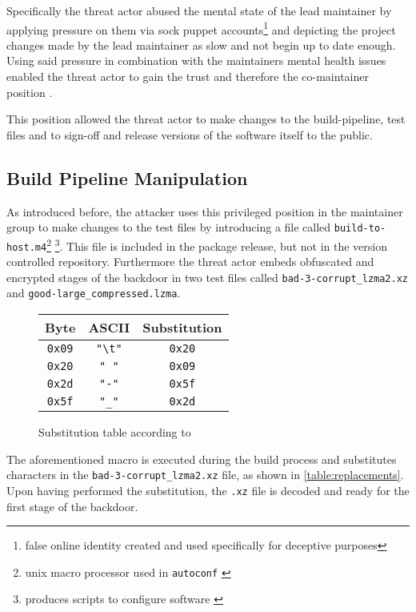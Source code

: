 Specifically the threat actor abused the mental state of the lead maintainer by
applying pressure on them via sock puppet accounts\footnote{false online
identity created and used specifically for deceptive purposes} and depicting
the project changes made by the lead maintainer as slow and not begin up to
date enough. Using said pressure in combination with the maintainers mental
health issues enabled the threat actor to gain the trust and therefore the
co-maintainer position \cite{arstechnica2024xzutils}. 

This position allowed the threat actor to make changes to the build-pipeline,
test files and to sign-off and release versions of the software itself to the
public.

\subsection{Build Pipeline Manipulation}

As introduced before, the attacker uses this privileged position in the
maintainer group to make changes to the test files by introducing a file
called \texttt{build-to-host.m4}\footnote{unix macro processor used in
\texttt{autoconf} \cite{gnu2021m4}} \footnote{produces scripts to configure
software \cite{gnu2020autoconf}}. This file is included in the package
release, but not in the version controlled repository. Furthermore the
threat actor embeds obfuscated and encrypted stages of the backdoor in two
test files called \texttt{bad-3-corrupt\_lzma2.xz} and
\texttt{good-large\_compressed.lzma}.

\begin{figure}[H]
    \centering
    \begin{tabular}{c c c}
        Byte & ASCII & Substitution \\
        \hline
        \texttt{0x09} & \texttt{"\textbackslash t"} & \texttt{0x20}\\
        \texttt{0x20} & \texttt{" "} & \texttt{0x09} \\
        \texttt{0x2d} & \texttt{"-"} & \texttt{0x5f} \\
        \texttt{0x5f} & \texttt{"\_"} & \texttt{0x2d} \\
    \end{tabular}
    \label{table:replacements}
    \caption{Substitution table according to \cite{arstechnica2024xzutils}}
\end{figure}

The aforementioned macro is executed during the build process and
substitutes characters in the \texttt{bad-3-corrupt\_lzma2.xz} file, as
shown in \autoref{table:replacements}. Upon having performed the
substitution, the \texttt{.xz} file is decoded and ready for the first stage
of the backdoor. 

